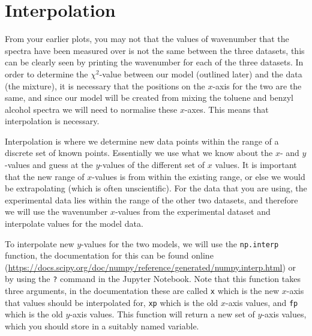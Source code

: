 \documentclass[a4paper]{article}
\begin{document}
\section{Interpolation}
From your earlier plots, you may not that the values of wavenumber that the spectra have been measured over is not the same between the three datasets, this can be clearly seen by printing the wavenumber for each of the three datasets. 
In order to determine the $\chi^2$-value between our model (outlined later) and the data (the mixture), it is necessary that the positions on the $x$-axis for the two are the same, and since our model will be created from mixing the toluene and benzyl alcohol spectra we will need to normalise these $x$-axes. 
This means that interpolation is necessary. 

Interpolation is where we determine new data points within the range of a discrete set of known points. 
Essentially we use what we know about the $x$- and $y$-values and guess at the $y$-values of the different set of $x$ values. 
It is important that the new range of $x$-values is from within the existing range, or else we would be extrapolating (which is often unscientific). 
For the data that you are using, the experimental data lies within the range of the other two datasets, and therefore we will use the wavenumber $x$-values from the experimental dataset and interpolate values for the model data.

To interpolate new $y$-values for the two models, we will use the \texttt{np.interp} function, the documentation for this can be found online (\url{https://docs.scipy.org/doc/numpy/reference/generated/numpy.interp.html}) or by using the \texttt{?} command in the Jupyter Notebook.
Note that this function takes three arguments, in the documentation these are called \texttt{x} which is the new $x$-axis that values should be interpolated for, \texttt{xp} which is the old $x$-axis values, and \texttt{fp} which is the old $y$-axis values. 
This function will return a new set of $y$-axis values, which you should store in a suitably named variable. 
\end{document}
